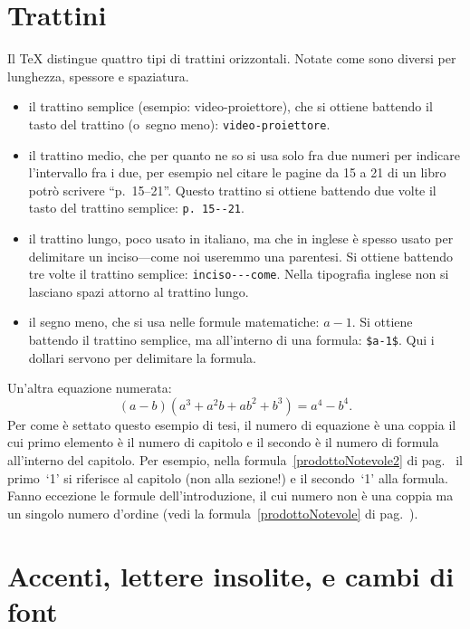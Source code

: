 \section{Trattini}

Il \TeX{} distingue quattro tipi di trattini
orizzontali. Notate come sono diversi per lunghezza,
spessore e spaziatura.

\begin{itemize}

\item il trattino semplice (esempio:
video-proiettore), che si ottiene battendo il tasto del
trattino (o~segno meno): \verb!video-proiettore!.

\item il trattino medio, che per quanto ne so si usa
solo fra due numeri per indicare l'intervallo fra i due,
per esempio nel citare le pagine da 15 a 21 di un libro
potrò scrivere ``p.~15--21''. Questo trattino si
ottiene battendo due volte il tasto del trattino semplice:
\verb!p. 15--21!.

\item il trattino lungo, poco usato in italiano, ma che
in inglese è spesso usato per delimitare un
inciso---come noi useremmo una parentesi. Si ottiene
battendo tre volte il trattino semplice:
\verb!inciso---come!. Nella tipografia inglese non si
lasciano spazi attorno al trattino lungo.

\item il segno meno, che si usa nelle formule
matematiche: $a-1$. Si ottiene battendo il trattino
semplice, ma all'interno di una formula: \verb!$a-1$!.
Qui i dollari servono per delimitare la formula.

\end{itemize}

Un'altra equazione numerata:
\begin{equation}
  (a-b)(a^3+a^2b+ab^2+b^3)=a^4-b^4.
\end{equation}
Per come è settato questo esempio di tesi, il numero di equazione è una coppia il cui primo elemento è il numero di capitolo e il secondo è il numero di formula all'interno del capitolo. Per esempio, nella formula~\eqref{prodottoNotevole2} di pag.~\pageref{prodottoNotevole2} il primo~`1' si riferisce al capitolo (non alla sezione!) e il secondo~`1' alla formula. Fanno eccezione le formule dell'introduzione, il cui numero non è una coppia ma un singolo numero d'ordine (vedi la formula~\eqref{prodottoNotevole} di pag.~\pageref{prodottoNotevole}).


\section{Accenti, lettere insolite, e cambi di font}

